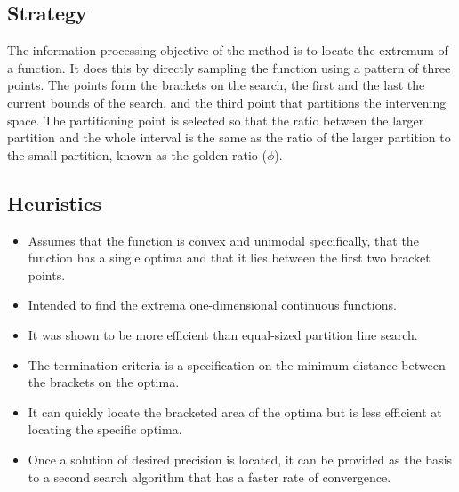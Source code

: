\subsection{Strategy}
The information processing objective of the method is to locate the extremum of a function.
It does this by directly sampling the function using a pattern of three points. The points form the brackets on the search, the first and the last the current bounds of the search, and the third point that partitions the intervening space. The partitioning point is selected so that the ratio between the larger partition and the whole interval is the same as the ratio of the larger partition to the small partition, known as the golden ratio ($\phi$). 

\subsection{Heuristics}

\begin{itemize}
	\item Assumes that the function is convex and unimodal specifically, that the function has a single optima and that it lies between the first two bracket points.
	\item Intended to find the extrema one-dimensional continuous functions.
	\item It was shown to be more efficient than equal-sized partition line search.
	\item The termination criteria is a specification on the minimum distance between the brackets on the optima.
	\item It can quickly locate the bracketed area of the optima but is less efficient at locating the specific optima.
	\item Once a solution of desired precision is located, it can be provided as the basis to a second search algorithm that has a faster rate of convergence.
\end{itemize}

